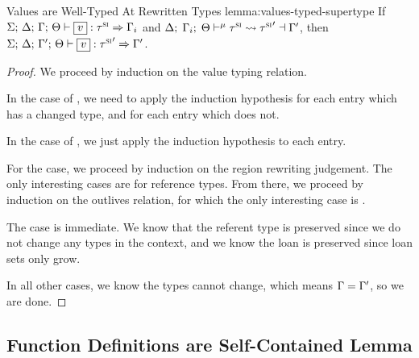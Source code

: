 \begin{oxlemma}{Values are Well-Typed At Rewritten Types}
  {lemma:values-typed-supertype} 
  If $\oxtypjudge{\oxglobalctx}{\oxtvarctx}{\oxkontctx}{\oxvarctx}{\oxvalue}{\oxsitype}
  {\oxvarctx_i}$ and $\Delta; \; \Gamma_i; \; \Theta \vdash^{\mu} \tau^\textsc{si} \leadsto {\tau^\textsc{si}}^\prime \dashv \Gamma^\prime$, then $\oxtypjudge{\oxglobalctx}
  {\oxtvarctx}{\oxkontctx}{\oxvarctx^\prime}{\oxvalue}{{\oxsitype}^\prime}{\oxvarctx^\prime}$.
\end{oxlemma}
\begin{proof}
  We proceed by induction on the value typing relation.

  In the case of , we need to apply the induction hypothesis for
  each entry which has a changed type, and 
  for each entry which does not.

  In the case of , we just apply the induction hypothesis to
  each entry.

  \vspace{1em}
  \noindent \framebox[\textwidth]{
    \figuresize
    \begin{mathpar}
      \TPointer
    \end{mathpar}
  }
  \vspace{1em}

  For the  case, we proceed by induction on the region
  rewriting judgement. The only interesting cases are for reference types. From
  there, we proceed by induction on the outlives relation, for which the only
  interesting case is .
 
  \vspace{1em}
  \noindent \framebox[\textwidth]{
    \figuresize
    \begin{mathpar}
      \UCombineLocalProvs
    \end{mathpar}
  }
  \vspace{1em}

  The  case is immediate. We know that the referent type is
  preserved since we do not change any types in the context, and we know the
  loan is preserved since loan sets only grow.

  In all other cases, we know the types cannot change, which means $\Gamma =
  \Gamma^\prime$, so we are done.
\end{proof}

\subsection{Function Definitions are Self-Contained Lemma}
\label{sec:function-defns-lemma}


